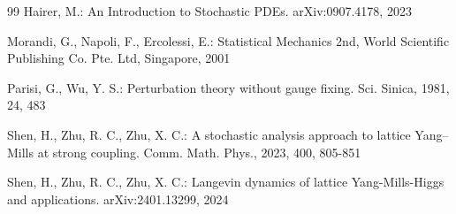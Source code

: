 \documentclass[11pt]{article}
\numberwithin{equation}{section}%
\numberwithin{figure}{section}%
\theoremstyle{remark}
\begin{document}
\begin{thebibliography}{99}
		Hairer, M.: An Introduction to Stochastic PDEs. arXiv:0907.4178, 2023 
		
	
		
		
		
	
		
	
	
		
		
		
	
		
		
		
		
		
		Morandi, G., Napoli, F., Ercolessi, E.: Statistical Mechanics 2nd, World Scientific Publishing Co. Pte. Ltd,
		Singapore, 2001
		
		Parisi, G., Wu, Y. S.: Perturbation theory without gauge fixing. Sci. Sinica, 1981, 24, 483
		
		
		
		Shen, H., Zhu, R. C., Zhu, X. C.: A stochastic analysis approach to lattice Yang–Mills at strong coupling. Comm. Math. Phys., 2023, 400, 805-851
		
		Shen, H., Zhu, R. C., Zhu, X. C.: Langevin dynamics of lattice Yang-Mills-Higgs and applications. arXiv:2401.13299, 2024
		

\end{thebibliography}
\end{document}
